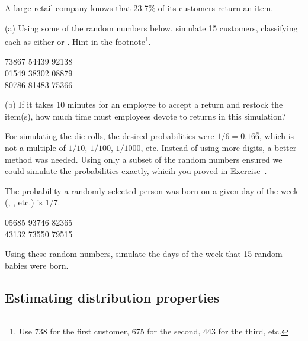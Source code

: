 \begin{exercise}\label{retailReturnAnIem}
A large retail company knows that 23.7\% of its customers return an item.

(a) Using some of the random numbers below, simulate 15 customers, classifying each as either  or . Hint in the footnote\footnote{Use 738 for the first customer, 675 for the second, 443 for the third, etc.}.
\begin{center}
73867\hspace{1mm} 54439\hspace{1mm} 92138 \\
01549\hspace{1mm} 38302\hspace{1mm} 08879 \\
80786\hspace{1mm} 81483\hspace{1mm} 75366 \\
\end{center}

(b) If it takes 10 minutes for an employee to accept a return and restock the item(s), how much time must employees devote to returns in this simulation?
\end{exercise}

For simulating the die rolls, the desired probabilities were $1/6 = 0.16\bar{6}$, which is not a multiple of $1/10$, $1/100$, $1/1000$, etc. Instead of using more digits, a better method was needed. Using only a subset of the random numbers ensured we could simulate the probabilities exactly, whicih you proved in Exercise~. \\

\begin{exercise}
The probability a randomly selected person was born on a given day of the week (, , etc.) is $1/7$.
\begin{center}
05685\hspace{1mm} 93746\hspace{1mm} 82365 \\
43132\hspace{1mm} 73550\hspace{1mm} 79515 \\
\end{center}
Using these random numbers, simulate the days of the week that 15 random babies were born.
\end{exercise}

\subsection{Estimating distribution properties}

